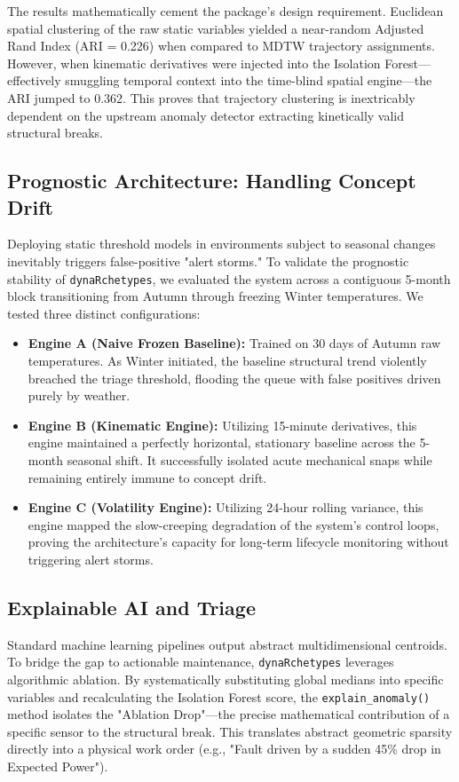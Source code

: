 \documentclass[final,3p,times]{elsarticle}
\begin{document}
The results mathematically cement the package's design requirement. Euclidean spatial clustering of the raw static variables yielded a near-random Adjusted Rand Index (ARI = 0.226) when compared to MDTW trajectory assignments. However, when kinematic derivatives were injected into the Isolation Forest—effectively smuggling temporal context into the time-blind spatial engine—the ARI jumped to 0.362. This proves that trajectory clustering is inextricably dependent on the upstream anomaly detector extracting kinetically valid structural breaks.

\subsection{Prognostic Architecture: Handling Concept Drift}
Deploying static threshold models in environments subject to seasonal changes inevitably triggers false-positive "alert storms." To validate the prognostic stability of \texttt{dynaRchetypes}, we evaluated the system across a contiguous 5-month block transitioning from Autumn through freezing Winter temperatures. We tested three distinct configurations:

\begin{itemize}
\item \textbf{Engine A (Naive Frozen Baseline):} Trained on 30 days of Autumn raw temperatures. As Winter initiated, the baseline structural trend violently breached the triage threshold, flooding the queue with false positives driven purely by weather.
\item \textbf{Engine B (Kinematic Engine):} Utilizing 15-minute derivatives, this engine maintained a perfectly horizontal, stationary baseline across the 5-month seasonal shift. It successfully isolated acute mechanical snaps while remaining entirely immune to concept drift.
\item \textbf{Engine C (Volatility Engine):} Utilizing 24-hour rolling variance, this engine mapped the slow-creeping degradation of the system's control loops, proving the architecture's capacity for long-term lifecycle monitoring without triggering alert storms.
\end{itemize}

\subsection{Explainable AI and Triage}
Standard machine learning pipelines output abstract multidimensional centroids. To bridge the gap to actionable maintenance, \texttt{dynaRchetypes} leverages algorithmic ablation. By systematically substituting global medians into specific variables and recalculating the Isolation Forest score, the \texttt{explain\_anomaly()} method isolates the "Ablation Drop"—the precise mathematical contribution of a specific sensor to the structural break. This translates abstract geometric sparsity directly into a physical work order (e.g., "Fault driven by a sudden 45\% drop in Expected Power").
\end{document}
